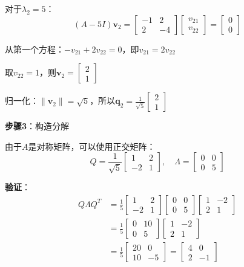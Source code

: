 \documentclass[12pt,a4paper]{article}
\begin{document}
对于$\lambda_2 = 5$：
\begin{equation}
(A - 5I)\bm{v}_2 = \begin{bmatrix} -1 & 2 \\ 2 & -4 \end{bmatrix} \begin{bmatrix} v_{21} \\ v_{22} \end{bmatrix} = \begin{bmatrix} 0 \\ 0 \end{bmatrix}
\end{equation}

从第一个方程：$-v_{21} + 2v_{22} = 0$，即$v_{21} = 2v_{22}$

取$v_{22} = 1$，则$\bm{v}_2 = \begin{bmatrix} 2 \\ 1 \end{bmatrix}$

归一化：$\|\bm{v}_2\| = \sqrt{5}$，所以$\bm{q}_2 = \frac{1}{\sqrt{5}} \begin{bmatrix} 2 \\ 1 \end{bmatrix}$

\textbf{步骤3}：构造分解

由于$A$是对称矩阵，可以使用正交矩阵：
\begin{equation}
Q = \frac{1}{\sqrt{5}} \begin{bmatrix} 1 & 2 \\ -2 & 1 \end{bmatrix}, \quad
\Lambda = \begin{bmatrix} 0 & 0 \\ 0 & 5 \end{bmatrix}
\end{equation}

\textbf{验证}：
\begin{align}
Q\Lambda Q^T &= \frac{1}{5} \begin{bmatrix} 1 & 2 \\ -2 & 1 \end{bmatrix} \begin{bmatrix} 0 & 0 \\ 0 & 5 \end{bmatrix} \begin{bmatrix} 1 & -2 \\ 2 & 1 \end{bmatrix} \\
&= \frac{1}{5} \begin{bmatrix} 0 & 10 \\ 0 & 5 \end{bmatrix} \begin{bmatrix} 1 & -2 \\ 2 & 1 \end{bmatrix} \\
&= \frac{1}{5} \begin{bmatrix} 20 & 0 \\ 10 & -5 \end{bmatrix} = \begin{bmatrix} 4 & 0 \\ 2 & -1 \end{bmatrix}
\end{align}
\end{document}
